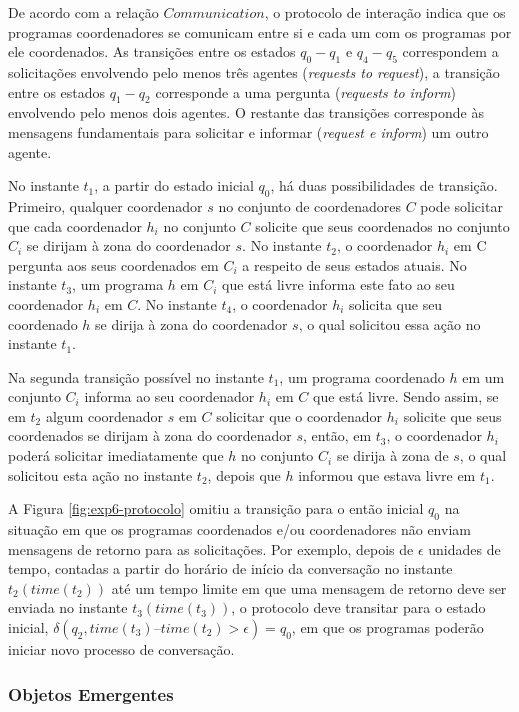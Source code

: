 De acordo com a relação $Communication$, o protocolo de interação indica que os programas coordenadores se comunicam entre si e cada um com os programas por ele coordenados. As transições entre os estados $q_0-q_1$ e $q_4-q_5$ correspondem a solicitações envolvendo pelo menos três agentes (\textit{requests to request}), a transição entre os estados $q_1-q_2$ corresponde a uma pergunta (\textit{requests to inform}) envolvendo pelo menos dois agentes. O restante das transições corresponde às mensagens fundamentais para solicitar e informar (\textit{request e inform}) um outro agente.

No instante $t_1$, a partir do estado inicial $q_0$, há duas possibilidades de transição. Primeiro, qualquer coordenador $s$ no conjunto de coordenadores $C$ pode solicitar que cada coordenador $h_i$ no conjunto $C$ solicite que seus coordenados no conjunto $C_i$ se dirijam à zona do coordenador $s$. No instante $t_2$, o coordenador $h_i$ em C pergunta aos seus coordenados em $C_i$ a respeito de seus estados atuais. No instante $t_3$, um programa $h$ em $C_i$ que está livre informa este fato ao seu coordenador $h_i$ em $C$. No instante $t_4$, o coordenador $h_i$ solicita que seu coordenado $h$ se dirija à zona do coordenador $s$, o qual solicitou essa ação no instante $t_1$.

Na segunda transição possível no instante $t_1$, um programa coordenado $h$ em um conjunto $C_i$ informa ao seu coordenador $h_i$ em $C$ que está livre. Sendo assim, se em $t_2$ algum coordenador $s$ em $C$ solicitar que o coordenador $h_i$ solicite que seus coordenados se dirijam à zona do coordenador $s$, então, em $t_3$, o coordenador $h_i$ poderá solicitar imediatamente que $h$ no conjunto $C_i$ se dirija à zona de $s$, o qual solicitou esta ação no instante $t_2$, depois que $h$ informou que estava livre em $t_1$. 

A Figura \ref{fig:exp6-protocolo} omitiu a transição para o então inicial $q_0$ na situação em que os programas coordenados e/ou coordenadores não enviam mensagens de retorno para as solicitações. Por exemplo, depois de $\epsilon$ unidades de tempo, contadas a partir do horário de início da conversação no instante $t_2 (time(t_2))$ até um tempo limite em que uma mensagem de retorno deve ser enviada no instante $t_3 (time(t_3))$, o protocolo deve transitar para o estado inicial, $\delta(q_2, time(t_3) – time(t_2) > \epsilon) = q_0$, em que os programas poderão iniciar novo processo de conversação.

\subsubsection{Objetos Emergentes}

